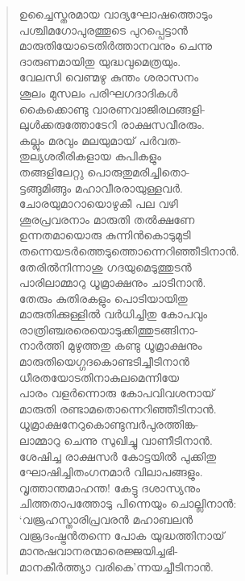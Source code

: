 \begin{verse}
ഉച്ചൈസ്തരമായ വാദ്യഘോഷത്തൊടും\\
പശ്ചിമഗോപുരത്തൂടെ പുറപ്പെട്ടാന്‍\\
മാരുതിയോടെതിര്‍ത്താനവനും ചെന്നു\\
ദാരുണമായിതു യുദ്ധവുമെത്രയും.\\
വേലസി വെണ്മഴു കുന്തം ശരാസനം\\
ശൂലം മുസലം പരിഘഗദാദികള്‍\\
കൈക്കൊണ്ടു വാരണവാജിരഥങ്ങളി-\\
ലുള്‍ക്കരുത്തോടേറി രാക്ഷസവീരരും.\\
കല്ലും മരവും മലയുമായ് പര്‍വത-\\
തുല്യശരീരികളായ കപികളും\\
തങ്ങളിലേറ്റു പൊരുതുമരിച്ചിതൊ-\\
ട്ടങ്ങുമിങ്ങും മഹാവീരരായുള്ളവര്‍.\\
ചോരയുമാറായൊഴുകീ പല വഴി\\
ശൂരപ്രവരനാം മാരുതി തല്‍ക്ഷണേ\\
ഉന്നതമായൊരു കുന്നിന്‍കൊടുമുടി\\
തന്നെയടര്‍ത്തെടുത്തൊന്നെറിഞ്ഞീടിനാന്‍.\\
തേരില്‍നിന്നാശു ഗദയുമെടുത്തുടന്‍\\
പാരിലാമ്മാറു ധൂമ്രാക്ഷനും ചാടിനാന്‍.\\
തേരും കുതിരകളും പൊടിയായിതു\\
മാരുതിക്കുള്ളില്‍ വര്‍ധിച്ചിതു കോപവും\\
രാത്രിഞ്ചരരെയൊടുക്കിത്തുടങ്ങിനാ-\\
നാര്‍ത്തി മുഴുത്തതു കണ്ടു ധൂമ്രാക്ഷനും\\
മാരുതിയെഗ്ഗദകൊണ്ടടിച്ചീടിനാന്‍\\
ധീരതയോടതിനാകുലമെന്നിയേ\\
പാരം വളര്‍ന്നൊരു കോപവിവശനായ്\\
മാരുതി രണ്ടാമതൊന്നെറിഞ്ഞീടിനാന്‍.\\
ധൂമ്രാക്ഷനേറുകൊണ്ടുമ്പര്‍പുരത്തിങ്ക-\\
ലാമ്മാറു ചെന്നു സുഖിച്ചു വാണീടിനാന്‍.\\
ശേഷിച്ച രാക്ഷസര്‍ കോട്ടയില്‍ പുക്കിതു\\
ഘോഷിച്ചിതംഗനമാര്‍ വിലാപങ്ങളും.\\
വൃത്താന്തമാഹന്ത! കേട്ടു ദശാസ്യനും\\
ചിത്തതാപത്തോടു പിന്നെയും ചൊല്ലിനാന്‍:\\
‘വജ്രഹസ്താരിപ്രവരന്‍ മഹാബലന്‍\\
വജ്രദംഷ്ട്രന്‍തന്നെ പോക യുദ്ധത്തിനായ്\\
മാനുഷവാനരന്മാരെജ്ജയിച്ചഭി-\\
മാനകീര്‍ത്ത്യാ വരികെ’ന്നയച്ചീടിനാന്‍.\\

\end{verse}

